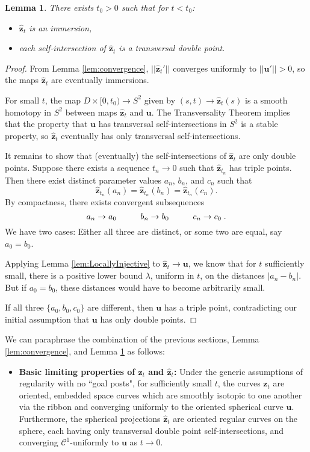 \documentclass[12pt]{article}
\numberwithin{equation}{subsection}
\newtheorem{lem}{Lemma}[thm]
\theoremstyle{definition}
\numberwithin{lem}{section}
\def\uu{\mathbf{u}}
\def\zz{\mathbf{z}}
\def\zhat{\mathbf{\hat{z}}}
\def\C{\mathcal{C}}
\begin{document}
\begin{lem}
There exists $t_0>0$ such that for $t<t_0$: 
\begin{itemize}
\item $\zhat_t$ is an immersion, 
\item each self-intersection of $\zhat_t$ is a transversal double point.
\end{itemize}
\label{lem:ZhatTnice}
\end{lem}

\begin{proof}
From Lemma \ref{lem:convergence},  $||\zhat_t'||$ converges uniformly to $||\uu'||>0$, so the maps $\zhat_t$ are eventually immersions.

For small $t$, the map $D \times [0,t_0) \to S^2$ given by $(s,t) \to \zhat_t(s)$  is a smooth homotopy in $S^2$ between maps $\zhat_t$ and $\uu$. The Transversality Theorem  \cite{GP74} implies that the property that $\uu$ has transversal self-intersections in $S^2$ is a stable property, so  $\zhat_t$ eventually has only transversal self-intersections. 

It remains to show that (eventually) the self-intersections of $\zhat_t$ are only double points.
Suppose there exists a sequence $t_n \rightarrow 0$ such that $\hat{\zz}_{t_n}$ has triple points.  Then there exist distinct parameter values $a_n$, $b_n$, and $c_n$ such that 
$$\hat{\zz}_{t_n}(a_n) = \hat{\zz}_{t_n}(b_n) = \hat{\zz}_{t_n}(c_n).$$
By compactness, there exists convergent subsequences
$$a_n \rightarrow a_0 \hspace{1 cm} b_n \rightarrow b_0 \hspace{1 cm} c_n \rightarrow c_0\;.$$
We have two cases: Either all three are distinct, or some two are equal, say $a_0=b_0$.

Applying Lemma \ref{lem:LocallyInjective} to $\zhat_t \to \uu$, we know that for $t$ sufficiently small, there is a positive lower bound $\lambda$, uniform in $t$, on the distances $|a_n-b_n|$. But if $a_0=b_0$, these distances would have to become arbitrarily small.

If all three $\{a_0, b_0, c_0\}$ are different, then $\uu$ has a triple point, contradicting our initial assumption that $\uu$ has only double points.
\end{proof}

\noindent We can paraphrase the combination of the previous sections, Lemma \ref{lem:convergence}, and Lemma \ref{lem:ZhatTnice}  as follows:
\begin{itemize}
\item {\bf Basic limiting properties of $\zz_t$ and $\zhat_t$:}
 Under the generic assumptions of regularity with no ``goal posts", for sufficiently small $t$, the curves $\zz_t$ are oriented, embedded space curves which are smoothly isotopic to one another via the ribbon and converging uniformly to the oriented spherical curve $\uu$.  Furthermore, the spherical projections $\zhat_t$ are oriented regular curves on the sphere, each having only transversal double point self-intersections, and converging 
$\C^1$-uniformly to $\uu$ as $t \to 0$. 
\end{itemize}
\end{document}
